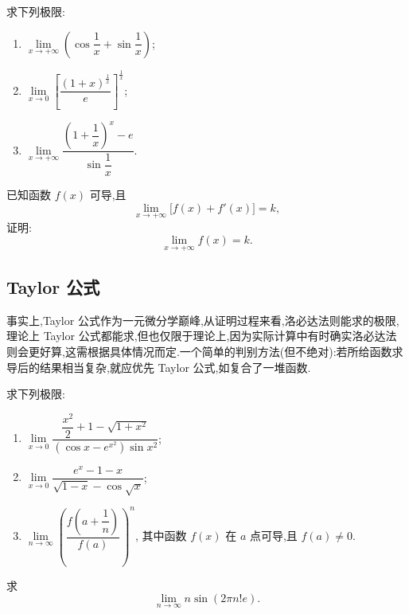 \documentclass[../数学分析培优讲义.tex]{subfiles}
\begin{document}
\begin{example}
求下列极限:
\begin{enumerate}[label=(\arabic*)]
    \item $\displaystyle
    \lim\limits_{x\to+\infty}\left(\cos\dfrac{1}{x}+\sin\dfrac{1}{x}\right)$;
    \item $\displaystyle
    \lim\limits_{x\to0}
    \left[\dfrac{(1+x)^{\frac{1}{x}}}{e}\right]^{\frac{1}{x}}$;
    \item $\displaystyle
    \lim\limits_{x\to+\infty}
    \dfrac{\left(1+\dfrac{1}{x}\right)^x-e}{\sin\dfrac{1}{x}}$.
\end{enumerate}
\end{example}
\exampleblank

\begin{example}[\markstar]
已知函数 $f(x)$ 可导,且
\[
    \lim\limits_{x\to+\infty}\bigl[f(x)+f'(x)\bigr]=k,
\]
证明:
\[
    \lim\limits_{x\to+\infty}f(x)=k.
\]
\end{example}
\exampleblank


\newpage

\subsection{Taylor 公式}

事实上,Taylor 公式作为一元微分学巅峰,从证明过程来看,洛必达法则能求的极限,理论上 Taylor 公式都能求,但也仅限于理论上,因为实际计算中有时确实洛必达法则会更好算,这需根据具体情况而定.一个简单的判别方法(但不绝对):若所给函数求导后的结果相当复杂,就应优先 Taylor 公式,如复合了一堆函数.

\begin{example}
求下列极限:
\begin{enumerate}[label=(\arabic*)]
    \item $\displaystyle
    \lim\limits_{x\to0}
    \dfrac{\dfrac{x^2}{2}+1-\sqrt{1+x^2}}
    {(\cos x-e^{x^2})\sin x^2}$;
    \item $\displaystyle
    \lim\limits_{x\to0}
    \dfrac{e^x-1-x}{\sqrt{1-x}-\cos\sqrt{x}}$;
    \item $\displaystyle
    \lim\limits_{n\to\infty}
    \left(\dfrac{f\left(a+\dfrac{1}{n}\right)}{f(a)}\right)^n$,
    其中函数 $f(x)$ 在 $a$ 点可导,且 $f(a)\neq0$.
\end{enumerate}
\end{example}
\exampleblank

\begin{example}
求
\[
    \lim\limits_{n\to\infty}n\sin(2\pi n!e).
\]
\end{example}
\exampleblank
\end{document}
